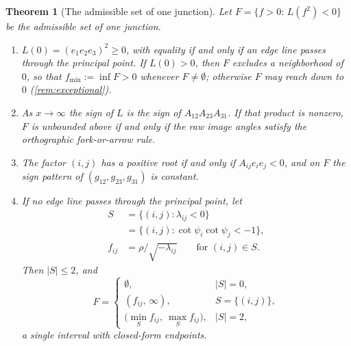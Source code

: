 \documentclass[pdflatex,sn-mathphys-num,iicol]{sn-jnl}
\newcommand{\fmin}{f_{\min}}
\theoremstyle{thmstyleone}
\newtheorem{theorem}{Theorem}
\theoremstyle{thmstylethree}
\theoremstyle{thmstyletwo}
\begin{document}
\begin{theorem}[The admissible set of one junction]\label{thm:interval}\label{prop:bound}
Let $F=\{f>0:\,L(f^2)<0\}$ be the admissible set of one junction.
\begin{enumerate}
\item $L(0)=(e_1e_2e_3)^2\ge 0$, with equality if and only if an edge line passes through the principal point. If $L(0)>0$, then $F$ excludes a neighborhood of $0$, so that $\fmin:=\inf F>0$ whenever $F\neq\emptyset$; otherwise $F$ may reach down to $0$ (\cref{rem:exceptional}).
\item As $x\to\infty$ the sign of $L$ is the sign of $A_{12}A_{23}A_{31}$. If that product is nonzero, $F$ is unbounded above if and only if the raw image angles satisfy the orthographic fork-or-arrow rule.
\item The factor $(i,j)$ has a positive root if and only if $A_{ij}e_ie_j<0$, and on $F$ the sign pattern of $(g_{12},g_{23},g_{31})$ is constant.
\item If no edge line passes through the principal point, let
\[
\begin{aligned}
S&=\{(i,j):\lambda_{ij}<0\}\\&=\{(i,j):\cot\psi_i\cot\psi_j<-1\},\\
f_{ij}&=\rho/\sqrt{-\lambda_{ij}}\qquad\text{for }(i,j)\in S .
\end{aligned}
\]
Then $|S|\le2$, and
\[
F=\begin{cases}
\emptyset, & |S|=0,\\[2pt]
(f_{ij},\,\infty), & S=\{(i,j)\},\\[2pt]
\bigl(\min_S f_{ij},\ \max_S f_{ij}\bigr), & |S|=2,
\end{cases}
\]
a single interval with closed-form endpoints.
\end{enumerate}
\end{theorem}
\end{document}
